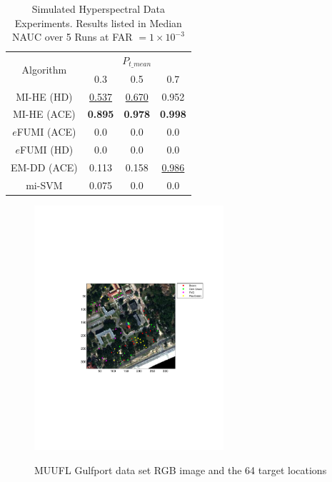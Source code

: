 \documentclass{article}
\begin{document}
\begin{table} 
	\begin{center}
		\caption{Simulated Hyperspectral Data Experiments. Results listed in Median NAUC over 5 Runs at FAR $=1\times10^{-3}$}\label{tab:AUC_toydata}
		\begin{tabular}{|c|c|c|c|}
			\hline
			\multirow{2}{*}{Algorithm} 	&  \multicolumn{3}{c|}{$P_{t\_mean}$} \\
			\cline{2-4}&{0.3}&{0.5}&{0.7}\\
			\hline\hline
			{MI-HE (HD)}      &   \underline{0.537}      &      \underline{0.670}              &   0.952     \\\hline
			{MI-HE (ACE)}     &      \textbf{0.895}      &      \textbf{0.978}     &   \textbf{0.998}    \\\hline
			{$e$FUMI (ACE)}  &      0.0                 &      0.0                &   0.0    \\\hline
			{$e$FUMI (HD)}   &      0.0                 &      0.0                &   0.0     \\\hline
			{EM-DD (ACE)}    &      0.113               &      {0.158}  &   \underline{0.986}    \\\hline
			{mi-SVM}         &      0.075               &      0.0              &   {0.0}    \\\hline
		\end{tabular}
	\end{center}
\end{table}

\begin{figure}
	\centering
	{\includegraphics[width=7cm]{Fig_muufl.pdf}}
	\caption{MUUFL Gulfport data set RGB image and the 64 target locations}
	\label{fig:gulfport_rgb}
\end{figure}
\end{document}
